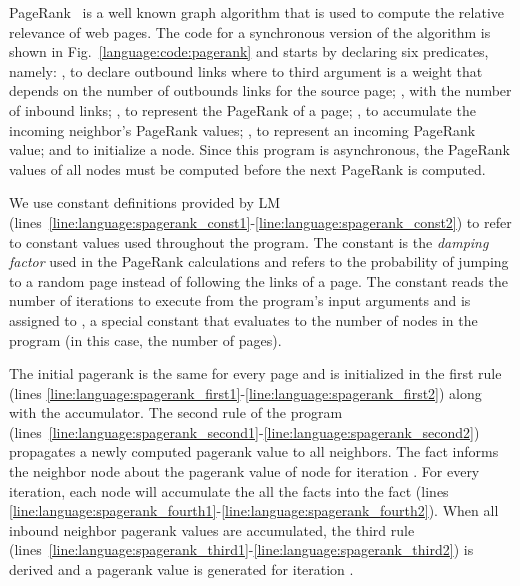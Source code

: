 PageRank~\cite{Page:2001:MNR} is a well known graph algorithm that is used to
compute the relative relevance of web pages.  The code for a synchronous version
of the algorithm is shown in Fig.~\ref{language:code:pagerank} and starts by
declaring six predicates, namely: , to declare outbound links
where to third argument is a weight that depends on the number of outbounds
links for the source page; , with the number of inbound links;
, to represent the PageRank of a page; , to
accumulate the incoming neighbor's PageRank values; , to
represent an incoming PageRank value; and  to initialize a node.
Since this program is asynchronous, the PageRank values of all nodes must be
computed before the next PageRank is computed.

We use constant definitions provided by LM
(lines~\ref{line:language:spagerank_const1}-\ref{line:language:spagerank_const2})
to refer to constant values used throughout the program. The 
constant is the \emph{damping factor} used in the PageRank calculations and
refers to the probability of jumping to a random page instead of following the
links of a page. The constant  reads the number of iterations
to execute from the program's input arguments and  is assigned to
, a special constant that evaluates to the number of nodes in the
program (in this case, the number of pages).

The initial pagerank is the same for every page and is initialized in the first
rule (lines
\ref{line:language:spagerank_first1}-\ref{line:language:spagerank_first2}) along
with the accumulator.  The second rule of the program
(lines~\ref{line:language:spagerank_second1}-\ref{line:language:spagerank_second2})
propagates a newly computed pagerank value to all neighbors. The fact
 informs the neighbor node about the pagerank value of
node  for iteration . For every iteration, each node will
accumulate the all the  facts into the
 fact (lines
\ref{line:language:spagerank_fourth1}-\ref{line:language:spagerank_fourth2}).
When all inbound neighbor pagerank values are accumulated, the third rule
(lines~\ref{line:language:spagerank_third1}-\ref{line:language:spagerank_third2})
is derived and a pagerank value is generated for iteration .

